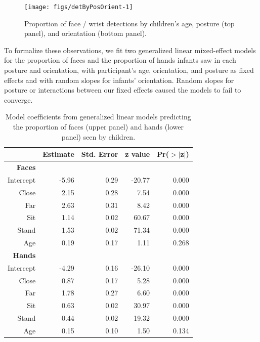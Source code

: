 \documentclass[10pt, letterpaper]{article}
\newenvironment{CodeChunk}{}{}
\begin{document}
\begin{CodeChunk}
\begin{figure}[h]

{\centering \texttt{[image: figs/detByPosOrient-1]} 

}

\caption[Proportion of face / wrist detections by children's age, posture (top panel), and orientation (bottom panel)]{Proportion of face / wrist detections by children's age, posture (top panel), and orientation (bottom panel).}\label{fig:detByPosOrient}
\end{figure}
\end{CodeChunk}

To formalize these observations, we fit two generalized linear
mixed-effect models for the proportion of faces and the proportion of
hands infants saw in each posture and orientation, with participant's
age, orientation, and posture as fixed effects and with random slopes
for infants' orientation. Random slopes for posture or interactions
between our fixed effects caused the models to fail to converge.

\begin{table}[ht]
\centering
\begin{tabular}{rrrrr}
  \hline
 & Estimate & Std. Error & z value & Pr($>$$|$z$|$) \\ 
  \hline
  \textbf{Faces} \\
  Intercept & -5.96 & 0.29 & -20.77 & 0.000 \\ 
  Close & 2.15 & 0.28 & 7.54 & 0.000 \\ 
  Far & 2.63 & 0.31 & 8.42 & 0.000 \\ 
  Sit & 1.14 & 0.02 & 60.67 & 0.000 \\ 
  Stand & 1.53 & 0.02 & 71.34 & 0.000 \\ 
  Age & 0.19 & 0.17 & 1.11 & 0.268 \\ 
  \hline
  \textbf{Hands} \\
  Intercept & -4.29 & 0.16 & -26.10 & 0.000 \\ 
  Close & 0.87 & 0.17 & 5.28 & 0.000 \\ 
  Far & 1.78 & 0.27 & 6.60 & 0.000 \\ 
  Sit & 0.63 & 0.02 & 30.97 & 0.000 \\ 
  Stand & 0.44 & 0.02 & 19.32 & 0.000 \\ 
  Age & 0.15 & 0.10 & 1.50 & 0.134 \\ 
   \hline
\end{tabular}
\caption{Model coefficients from generalized linear models predicting the proportion of faces (upper panel) and hands (lower panel) seen by children.} 
\vspace{-1em}
\end{table}
\end{document}
